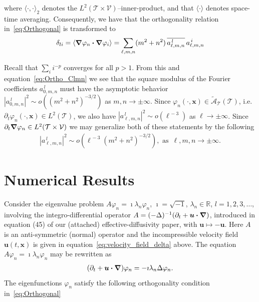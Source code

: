 \documentclass[leqno,onefignum,onetabnum]{siamltex1213}
\newcommand{\Tc}{\mathcal{T}}
\newcommand{\Vc}{\mathcal{V}}
\newcommand{\As}{\mathscr{A}}
\newcommand\bnabla{\mbox{\boldmath${\nabla}$}}
\providecommand\bcdot{\boldsymbol{\cdot}}
\newcommand{\vecx}{\boldsymbol{x}}
\newcommand{\vecu}{\boldsymbol{u}}
\begin{document}
where $\langle\cdot,\cdot\rangle_2$ denotes the $L^2(\Tc\times\Vc)$--inner-product, and that
$\langle\cdot\rangle$ denotes space-time averaging. Consequently, we have that the
orthogonality relation in~\eqref{eq:Orthogonal} is transformed to   
%
\begin{align}\label{eq:Ortho_Clmn}
  \delta_{li}=\langle\bnabla \varphi_n\bcdot\bnabla \varphi_i\rangle
      = \sum_{\ell,m,n}(m^2+n^2)\,\overline{a^{\,l}_{\ell,m,n}}\,a^{\,i}_{\ell,m,n}
\end{align}
%


Recall that $\sum_ii^{-p}$ converges for all $p>1$. From this and
equation~\eqref{eq:Ortho_Clmn} we see that the square modulus of the  
Fourier coefficients $a^{\,l}_{0,m,n}$ must have the asymptotic behavior 
$|a^{\,l}_{0,m,n}|^2\sim o((m^2+n^2)^{-3/2})$ as $m,n\to\pm\infty$. Since
$\varphi_n(\cdot,\vecx)\in\tilde{\As}_{\Tc}(\Tc)$, i.e. $\partial_t\varphi_n(\cdot,\vecx)\in L^2(\Tc)$, we also
have $|a^{\,l}_{\ell,m,n}|^2\sim o(\ell^{\,-3})$ as $\ell\to\pm\infty$. Since
$\partial_t\bnabla \varphi_n\in L^2(\Tc\times\Vc)$ we may generalize 
both of these statements by the following
%
\begin{align}\label{eq:Clmn_assymptotics}
  |a^{\,l}_{\ell,m,n}|^2\sim o(\ell^{\,-3}(m^2+n^2)^{-3/2}), \text{ as } \,\ell,m,n\to\pm\infty.
\end{align}
%







\section{Numerical Results}
%
Consider the eigenvalue problem $A\varphi_n=\imath\lambda_n\varphi_n$, $\imath=\sqrt{-1}$,
$\lambda_n\in\mathbb{R}$, $l=1,2,3,\ldots$, involving the integro-differential operator
$A=(-\Delta)^{-1}(\partial_t+\vecu \bcdot\bnabla )$,  
introduced in equation (45) of our (attached) effective-diffusivity
paper, with $\vecu \mapsto-\vecu $. Here $A$ is an anti-symmetric (normal)
operator and the incompressible velocity field
$\vecu (t,\vecx)$
is given in equation~\eqref{eq:velocity_field_delta} above. The equation $A\varphi_n=\imath\lambda_n\varphi_n$ may be
rewritten as     
%
\begin{align}\label{eq:Eig_prob}
  (\partial_t+\vecu \bcdot\bnabla )\varphi_n=-\imath\lambda_n\Delta\varphi_n.
\end{align}
%
The eigenfunctions $\varphi_n$ satisfy the following orthogonality condition
in~\eqref{eq:Orthogonal}
%
\end{document}
